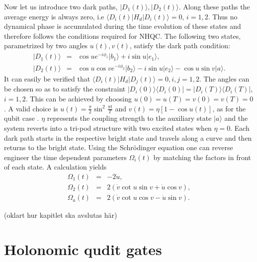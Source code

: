 \documentclass[pra,showpacs,priprent,twocolumn,superscriptaddress]{revtex4-1}
\newcommand{\ket}[1]{|#1\rangle}
\newcommand{\bra}[1]{\langle #1|}
\begin{document}
Now let us introduce two dark paths, $\ket{D_1(t)},\ket{D_2(t)}$. Along these paths the average energy is always zero, i.e $\bra{D_i(t)}H_d\ket{D_i(t)} = 0,\,i = 1,2$. Thus no dynamical phase is accumulated during the time evolution of these states and therefore follows the conditions required for NHQC. The following two states, parametrized by two angles $u(t), v(t)$, satisfy the dark path condition:
\begin{eqnarray}
\label{eq:dpaths}
\ket{D_1(t)} & = & \cos u e^{-i\phi_1}\ket{b_1} + i\sin u \ket{e_1},
\nonumber \\
\ket{D_2(t)} & = & \cos u\cos v e^{-i\phi_2}\ket{b_2} - i\sin u \ket{e_2} - \cos u\sin v \ket{a}.
\end{eqnarray}
It can easily be verified that $\bra{D_i(t)}H_d\ket{D_j(t)} = 0, i,j = 1,2$. The angles can be chosen so as to satisfy the constraint $\ket{D_i(0)}\bra{D_i(0)} = \ket{D_i(T)}\bra{D_i(T)}$, $i = 1,2$. This can be achieved by choosing $u(0) = u(T) = v(0) = v(T) = 0$. A valid choice is $u(t) = \frac{\pi}{2}\sin^2\frac{\pi t}{T}$ and $v(t) = \eta\left[1 - \cos u(t)\right]$, as for the qubit case \cite{ai22}. $\eta$ represents the coupling strength to the auxiliary state $\ket{a}$ and the system reverts into a tri-pod structure with two excited states when $\eta = 0$.
Each dark path starts in the respective bright state and travels along a curve and then returns to the bright state. Using the Schr{\"o}dinger equation one can reverse engineer the time dependent parameters $\Omega_i(t)$ by matching the factors in front of each state. A calculation yields 
\begin{eqnarray}
\Omega_1(t) &=& -2\dot{u},
 \nonumber \\ 
\Omega_2(t) &=& 2\left(\dot{v}\cot u\sin v + \dot{u}\cos v \right),
\nonumber \\
\Omega_a(t) &=& 2\left(\dot{v}\cot u\cos v - \dot{u}\sin v \right).
\end{eqnarray}


(oklart hur kapitlet ska avslutas här)

\section{Holonomic qudit gates}
\end{document}
